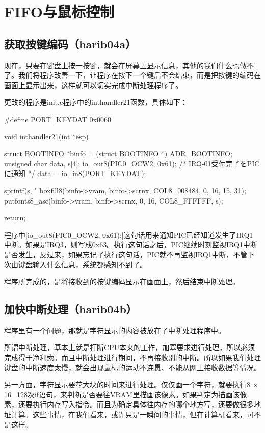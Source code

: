 ﻿\chapter{	FIFO与鼠标控制	}
\section{	获取按键编码（harib04a）	}
现在，只要在键盘上按一按键，就会在屏幕上显示信息，其他的我们什么也做不了。我们将程序改善一下，让程序在按下一个键后不会结束，而是把按键的编码在画面上显示出来，这样就可以切实完成中断处理程序了。

更改的程序是init.c程序中的inthandler21函数，具体如下：
\begin{code}
#define PORT_KEYDAT		0x0060

void inthandler21(int *esp)
{
	struct BOOTINFO *binfo = (struct BOOTINFO *) ADR_BOOTINFO;
	unsigned char data, s[4];
	io_out8(PIC0_OCW2, 0x61);	/* IRQ-01受付完了をPICに通知 */
	data = io_in8(PORT_KEYDAT);

	sprintf(s, "%
	boxfill8(binfo->vram, binfo->scrnx, COL8_008484, 0, 16, 15, 31);
	putfonts8_asc(binfo->vram, binfo->scrnx, 0, 16, COL8_FFFFFF, s);

	return;
}
\end{code}

\cs

程序中|io_out8(PIC0_OCW2, 0x61);|这句话用来通知PIC已经知道发生了IRQ1 中断。如果是IRQ3，则写成0x63。执行这句话之后，PIC继续时刻监视IRQ1中断是否发生，反过来，如果忘记了执行这句话，PIC就不再监视IRQ1中断，不管下次由键盘输入什么信息，系统都感知不到了。

\cs
程序所完成的，是将接收到的按键编码显示在画面上，然后结束中断处理。

\section{	加快中断处理（harib04b）	}
程序里有一个问题，那就是字符显示的内容被放在了中断处理程序中。

所谓中断处理，基本上就是打断CPU本来的工作，加塞要求进行处理，所以必须完成得干净利索。而且中断处理进行期间，不再接收别的中断。所以如果我们处理键盘的中断速度太慢，就会出现鼠标的运动不连贯、不能从网上接收数据等情况。

另一方面，字符显示要花大块的时间来进行处理。仅仅画一个字符，就要执行8 $\times$16=128次if语句，来判断是否要往VRAM里描画该像素。如果判定为描画该像素，还要执行内存写入指令。而且为确定具体往内存的哪个地方写，还要做很多地址计算。这些事情，在我们看来，或许只是一瞬间的事情，但在计算机看来，可不是这样。

